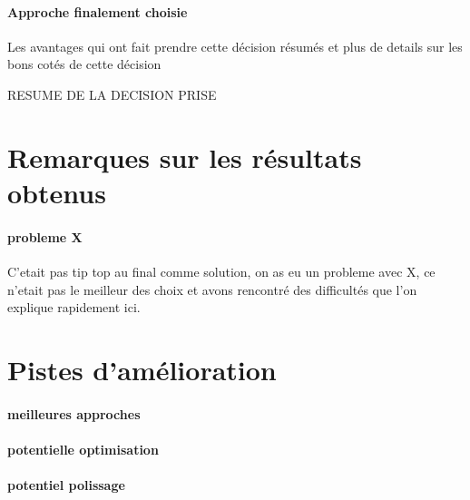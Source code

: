 		\paragraph{Approche finalement choisie}
		Les avantages qui ont fait prendre cette décision résumés et plus de details sur les bons cotés de cette décision
		
		\begin{result}
			RESUME DE LA DECISION PRISE
		\end{result}
	
	\section{Remarques sur les résultats obtenus}
		
		\paragraph{probleme X}
		C'etait pas tip top au final comme solution, on as eu un probleme avec X, ce n'etait pas le meilleur des choix et avons rencontré des difficultés que l'on explique rapidement ici.
		
	\section{Pistes d'amélioration}
	
		\paragraph{meilleures approches}
		
		\paragraph{potentielle optimisation}
		
		\paragraph{potentiel polissage}